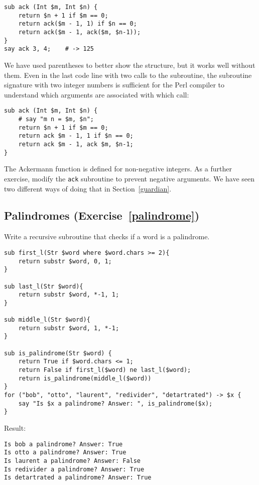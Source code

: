 \begin{verbatim}
sub ack (Int $m, Int $n) {
    return $n + 1 if $m == 0;
    return ack($m - 1, 1) if $n == 0;
    return ack($m - 1, ack($m, $n-1));
}
say ack 3, 4;    # -> 125
\end{verbatim}

We have used parentheses to better show the structure, but 
it works well without them. Even in the last code line with
two calls to the subroutine, the subroutine signature with 
two integer numbers is sufficient for the Perl compiler 
to understand which arguments are associated with which call:

\begin{verbatim}
sub ack (Int $m, Int $n) {
    # say "m n = $m, $n";
    return $n + 1 if $m == 0;
    return ack $m - 1, 1 if $n == 0;
    return ack $m - 1, ack $m, $n-1;
}
\end{verbatim}
%

The Ackermann function is defined for non-negative integers. 
As a further exercise, modify the {\tt ack} subroutine to 
prevent negative arguments. We have seen two different ways 
of doing that in Section~\ref{guardian}.


\subsection{Palindromes (Exercise~\ref{palindrome})}
\label{sol_palindrome}

Write a recursive subroutine that checks if a word is a 
palindrome.

\begin{verbatim}
sub first_l(Str $word where $word.chars >= 2){
    return substr $word, 0, 1;
}

sub last_l(Str $word){
    return substr $word, *-1, 1;
}

sub middle_l(Str $word){
    return substr $word, 1, *-1;
}

sub is_palindrome(Str $word) {
    return True if $word.chars <= 1;
    return False if first_l($word) ne last_l($word);
    return is_palindrome(middle_l($word))
}
for ("bob", "otto", "laurent", "redivider", "detartrated") -> $x {
    say "Is $x a palindrome? Answer: ", is_palindrome($x);
}
\end{verbatim}

Result:
\begin{verbatim}
Is bob a palindrome? Answer: True
Is otto a palindrome? Answer: True
Is laurent a palindrome? Answer: False
Is redivider a palindrome? Answer: True
Is detartrated a palindrome? Answer: True
\end{verbatim}

